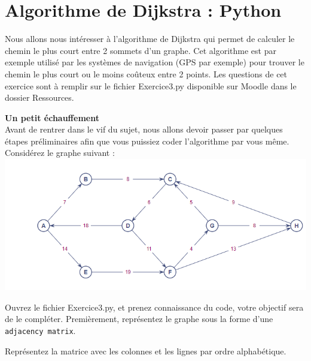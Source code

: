 \section{Algorithme de Dijkstra : Python}
Nous allons nous intéresser à l'algorithme de Dijkstra qui permet de calculer le chemin le plus court entre 2 sommets d'un graphe. Cet algorithme est par exemple utilisé par les systèmes de navigation (GPS par exemple) pour trouver le chemin le plus court ou le moins coûteux entre 2 points. Les questions de cet exercice sont à remplir sur le fichier Exercice3.py disponible sur Moodle dans le dossier Ressources. \\
\begin{Exercice}[10 minutes]\textbf{Un petit échauffement}\\

Avant de rentrer dans le vif du sujet, nous allons devoir passer par quelques étapes préliminaires afin que vous puissiez coder l'algorithme par vous même. Considérez le graphe suivant :\\
\includegraphics[]{Dijkstra.PNG}

Ouvrez le fichier Exercice3.py, et prenez connaissance du code, votre objectif sera de le compléter. Premièrement, représentez le graphe sous la forme d'une \lstinline{adjacency matrix}.
\end{Exercice}
\begin{conseil}
    Représentez la matrice avec les colonnes et les lignes par ordre alphabétique.
\end{conseil}
\begin{solution}
    
\end{solution}
\newpage
